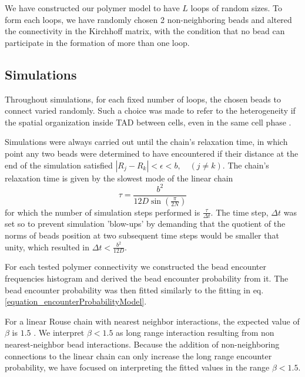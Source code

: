 \documentclass[12pt]{article}
\begin{document}
We have constructed our polymer model to have $L$ loops of random sizes. To form each loops, we have randomly chosen 2 non-neighboring beads and altered the connectivity in the Kirchhoff matrix, with the condition that no bead can participate in the formation of more than one loop.

\subsection{Simulations}\label{subsection_simulations}
Throughout simulations, for each fixed number of loops, the chosen beads to connect varied randomly. Such a choice was made to refer to the heterogeneity if the spatial organization inside TAD between cells, even in the same cell phase \cite{Nora2012}.

Simulations were always carried out until the chain's relaxation time, in which point any two beads were determined to have encountered if their distance at the end of the simulation satisfied $|R_j-R_k|<\epsilon<b,\quad  (j\ne k)$.
The chain's relaxation time is given by the slowest mode of the linear chain
\begin{equation*}
\tau =\frac{b^2}{12D\sin(\frac{\pi}{2N})}
\end{equation*}
for which the number of simulation steps performed is $\frac{\tau}{\Delta t} $. The time step, $\Delta t$ was set so to prevent simulation 'blow-ups' by demanding that the quotient of the norms of beads position at two subsequent time steps would be smaller that unity, which resulted in $\Delta t < \frac{b^2}{12D}$.

For each tested polymer connectivity we constructed the bead encounter frequencies histogram and derived the bead encounter probability from it. The bead encounter probability was then fitted similarly to the fitting in eq. \ref{equation_encounterProbabilityModel}.

For a linear Rouse chain with nearest neighbor interactions, the expected value of $\beta$ is $1.5$ \cite{doi1986theory}. We interpret $\beta<1.5$ as long range interaction resulting from non nearest-neighbor bead interactions.
Because the addition of non-neighboring connections to the linear chain can only increase the long range encounter probability, we have focused on interpreting the fitted values in the range $\beta<1.5$.
\end{document}
